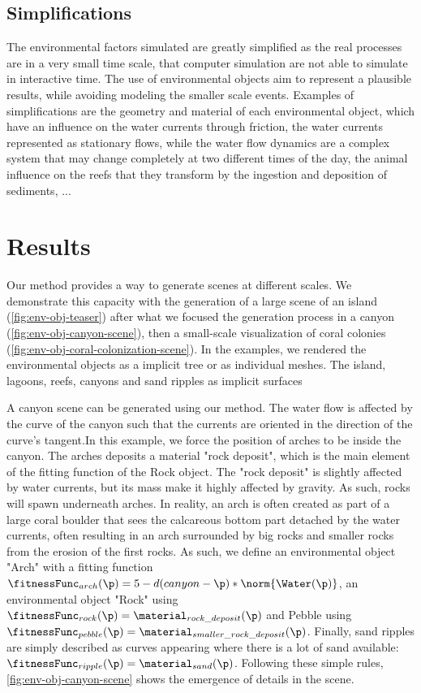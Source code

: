 \subsection{Simplifications}
\label{sec:env-obj-simplifications}
The environmental factors simulated are greatly simplified as the real processes are in a very small time scale, that computer simulation are not able to simulate in interactive time. The use of environmental objects aim to represent a plausible results, while avoiding modeling the smaller scale events. Examples of simplifications are the geometry and material of each environmental object, which have an influence on the water currents through friction, the water currents represented as stationary flows, while the water flow dynamics are a complex system that may change completely at two different times of the day, the animal influence on the reefs that they transform by the ingestion and deposition of sediments, ...


\section{Results}
\label{sec:env-obj-results}
Our method provides a way to generate scenes at different scales. We demonstrate this capacity with the generation of a large scene of an island (\cref{fig:env-obj-teaser}) after what we focused the generation process in a canyon (\cref{fig:env-obj-canyon-scene}), then a small-scale visualization of coral colonies (\cref{fig:env-obj-coral-colonization-scene}).
In the examples, we rendered the environmental objects as a implicit tree or as individual meshes. The island, lagoons, reefs, canyons and sand ripples as implicit surfaces

A canyon scene can be generated using our method. The water flow is affected by the curve of the canyon such that the currents are oriented in the direction of the curve's tangent.In this example, we force the position of arches to be inside the canyon. The arches deposits a material "rock deposit", which is the main element of the fitting function of the Rock object. The "rock deposit" is slightly affected by water currents, but its mass make it highly affected by gravity. As such, rocks will spawn underneath arches. In reality, an arch is often created as part of a large coral boulder that sees the calcareous bottom part detached by the water currents, often resulting in an arch surrounded by big rocks and smaller rocks from the erosion of the first rocks.
As such, we define an environmental object "Arch" with a fitting function $\fitnessFunc_{arch}(\p) = 5 - d(canyon - \p) * \norm{\Water(\p)}$, an environmental object "Rock" using $\fitnessFunc_{rock}(\p) = \material_{rock\_deposit}(\p)$ and Pebble using $\fitnessFunc_{pebble}(\p) = \material_{smaller\_rock\_deposit}(\p)$. Finally, sand ripples are simply described as curves appearing where there is a lot of sand available: $\fitnessFunc_{ripple}(\p) = \material_{sand}(\p)$.
Following these simple rules, \cref{fig:env-obj-canyon-scene} shows the emergence of details in the scene. 

